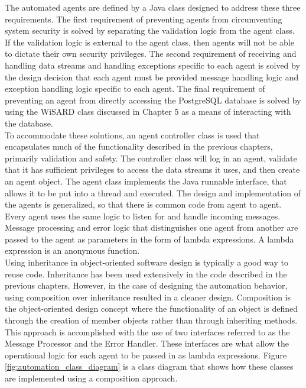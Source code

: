 

The automated agents are defined by a Java class designed to address these three requirements. The first requirement of preventing agents from circumventing system security is solved by separating the validation logic from the agent class. If the validation logic is external to the agent class, then agents will not be able to dictate their own security privileges. The second requirement of receiving and handling data streams and handling exceptions specific to each agent is solved by the design decision that each agent must be provided message handling logic and exception handling logic specific to each agent. The final requirement of preventing an agent from directly accessing the PostgreSQL database is solved by using the WiSARD class discussed in Chapter 5 as a means of interacting with the database.\\ 

To accommodate these solutions, an agent controller class is used that encapsulates much of the functionality described in the previous chapters, primarily validation and safety. The controller class will log in an agent, validate that it has sufficient privileges to access the data streams it uses, and then create an agent object. The agent class implements the Java runnable interface, that allows it to be put into a thread and executed. The design and implementation of the agents is generalized, so that there is common code from agent to agent. Every agent uses the same logic to listen for and handle incoming messages. Message processing and error logic that distinguishes one agent from another are passed to the agent as parameters in the form of lambda expressions. A lambda expression is an anonymous function.\\

Using inheritance in object-oriented software design is typically a good way to reuse code. Inheritance has been used extensively in the code described in the previous chapters. However, in the case of designing the automation behavior, using composition over inheritance resulted in a cleaner design. Composition is the object-oriented design concept where the functionality of an object is defined through the creation of member objects rather than through inheriting methods. This approach is accomplished with the use of two interfaces referred to as the Message Processor and the Error Handler. These interfaces are what allow the operational logic for each agent to be passed in as lambda expressions. Figure \ref{fig:automation_class_diagram} is a class diagram that shows how these classes are implemented using a composition approach.\\

